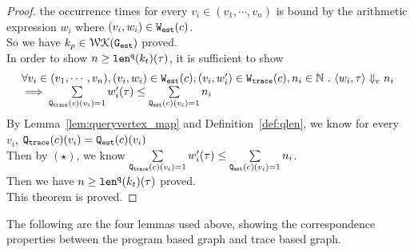 \begin{proof}
the occurrence times for every $v_i \in (v_1, \cdots, v_n)$ 
is bound by the arithmetic expression $w_i$ where $(v_i, w_i) \in \mathtt{{W_{est}}}(c)$.
\\
So we have $k_p \in \mathcal{WK}(\mathtt{{G_{est}}})$ proved.
\\
In order to show $ n \geq \mathtt{len}^{\tt q}(k_t)(\mathtt{\tau}) $, it is sufficient to show
\[
  \begin{array}{l}
  \forall v_i \in (v_1, \cdots, v_n),
  (v_i, w_i) \in \mathtt{{W_{est}}}(c), (v_i, w'_i) \in \mathtt{{W_{trace}}}(c), n_i \in \mathbb{N} 
  ~.~
  \langle w_i, \mathtt{\tau} \rangle \Downarrow_e n_i
  \\
  \implies
   \sum\limits_{\mathtt{{Q_{trace}}}(c)(v_i) = 1}
   w'_i(\mathtt{\tau}) 
   \leq 
   \sum\limits_{\mathtt{{Q_{est}}}(c)(v_i) = 1}n_i 
  \end{array}
  \]
By Lemma~\ref{lem:queryvertex_map} and Definition~\ref{def:qlen}, we know for every $v_i$, $\mathtt{{Q_{trace}}}(c)(v_i) = \mathtt{{Q_{est}}}(c)(v_i) $ 
\\
Then by $(\star)$, we know $  \sum\limits_{\mathtt{{Q_{trace}}}(c)(v_i) = 1}
w'_i(\mathtt{\tau}) 
\leq 
\sum\limits_{\mathtt{{Q_{est}}}(c)(v_i) = 1}n_i $.
\\
Then we have $ n \geq \mathtt{len}^{\tt q}(k_t)(\mathtt{\tau}) $ proved.
\\
This theorem is proved.
\end{proof}
The following are the four lemmas used above,
showing the correspondence properties between the program based graph and trace based graph.

